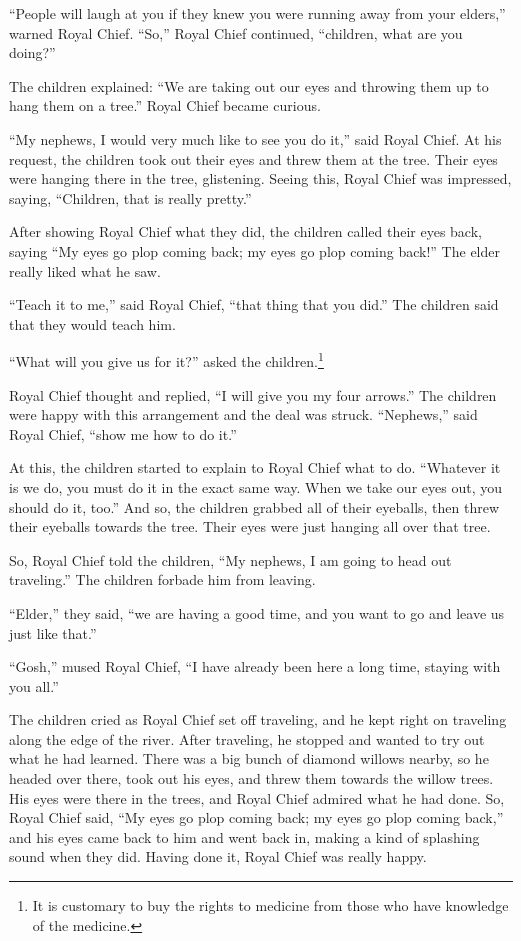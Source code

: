 ``People will laugh at you if they knew you were running away from your elders,'' warned Royal Chief. ``So,'' Royal Chief continued, ``children, what are you doing?''

The children explained: ``We are taking out our eyes and throwing them up to hang them on a tree.'' Royal Chief became curious.

``My nephews, I would very much like to see you do it,'' said Royal Chief. At his request, the children took out their eyes and threw them at the tree. Their eyes were hanging there in the tree, glistening. Seeing this, Royal Chief was impressed, saying, ``Children, that is really pretty.''

After showing Royal Chief what they did, the children called their eyes back, saying ``My eyes go plop coming back; my eyes go plop coming back!'' The elder really liked what he saw.

``Teach it to me,'' said Royal Chief, ``that thing that you did.'' The children said that they would teach him.

``What will you give us for it?'' asked the children.\footnote{It is customary to buy the rights to medicine from those who have knowledge of the medicine.}

Royal Chief thought and replied, ``I will give you my four arrows.'' The children were happy with this arrangement and the deal was struck. ``Nephews,'' said Royal Chief, ``show me how to do it.''

At this, the children started to explain to Royal Chief what to do. ``Whatever it is we do, you must do it in the exact same way. When we take our eyes out, you should do it, too.'' And so, the children grabbed all of their eyeballs, then threw their eyeballs towards the tree. Their eyes were just hanging all over that tree.

So, Royal Chief told the children, ``My nephews, I am going to head out traveling.'' The children forbade him from leaving.

``Elder,'' they said, ``we are having a good time, and you want to go and leave us just like that.''

``Gosh,'' mused Royal Chief, ``I have already been here a long time, staying with you all.''

The children cried as Royal Chief set off traveling, and he kept right on traveling along the edge of the river. After traveling, he stopped and wanted to try out what he had learned. There was a big bunch of diamond willows nearby, so he headed over there, took out his eyes, and threw them towards the willow trees. His eyes were there in the trees, and Royal Chief admired what he had done. So, Royal Chief said, ``My eyes go plop coming back; my eyes go plop coming back,'' and his eyes came back to him and went back in, making a kind of splashing sound when they did. Having done it, Royal Chief was really happy.


